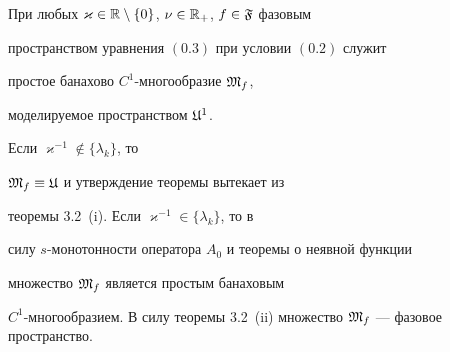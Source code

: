 \begin{thms}


При любых $\varkappa \in {\Bbb R} \setminus


\{ 0 \}$, $\nu \in {\Bbb R}_{+}$, $f \in {\frak F}$ фазовым


пространством уравнения $(0.3)$ при условии $(0.2)$ служит


простое банахово $C^1$-многообразие ${\frak M}_f$, 


моделируемое пространством ${\frak  U}^1$.


\end{thms}





\begin{pf}


Если $\varkappa^{-1} \notin \{ \lambda_k \}$, то


${\frak M}_f \equiv {\frak U}$ и утверждение теоремы вытекает из


теоремы 3.2~(i). Если $\varkappa^{-1} \in \{ \lambda_k \}$, то в


силу $s$-монотонности оператора $A_0$ и теоремы о неявной функции


множество ${\frak M}_f$ является простым банаховым


$C^1$-многообразием. В силу теоремы 3.2~(ii) множество ${\frak


M}_f$ --- фазовое пространство.


\end{pf}





